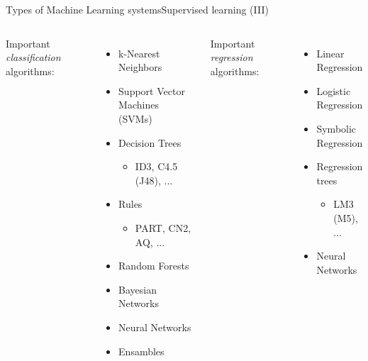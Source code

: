 \documentclass[10pt,compress]{beamer} %
\begin{document}
\begin{frame}{Types of Machine Learning systems}{Supervised learning (III)}
	\begin{columns}
	   Important \textit{classification} algorithms:
	   \begin{itemize}
	   		\item k-Nearest Neighbors
			\item Support Vector Machines (SVMs)
			\item Decision Trees
				\begin{itemize}
				\item ID3, C4.5 (J48), ...
				\end{itemize}
			\item Rules
				\begin{itemize}
				\item PART, CN2, AQ, ...
				\end{itemize}
			\item Random Forests
			\item Bayesian Networks
			\item Neural Networks
			\item Ensambles
	   \end{itemize}
	   Important \textit{regression} algorithms:
	   \begin{itemize}
	   		\item Linear Regression
			\item Logistic Regression
			\item Symbolic Regression
			\item Regression trees
				\begin{itemize}
				\item LM3 (M5), ...
				\end{itemize}
			\item Neural Networks
	   \end{itemize}
	\end{columns} 
\end{frame}
\end{document}
